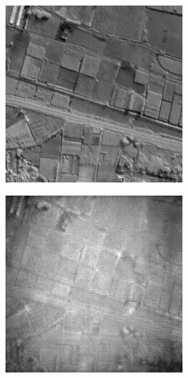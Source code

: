 \begin{figure}[H]
    \centering
    \begin{subfigure}[b]{0.24\textwidth}
        \centering
        \includegraphics[width=\textwidth]{../figs/outputs/pan/71.png}
    \end{subfigure}
    \hfill
    \begin{subfigure}[b]{0.24\textwidth}
        \centering
        \includegraphics[width=\textwidth]{../figs/outputs/cut/71.png}

\end{subfigure}
\end{figure}
